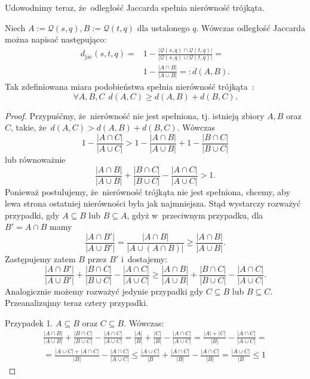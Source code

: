 \documentclass{praca1}
\begin{document}
Udowodnimy teraz, że~odległość Jaccarda spełnia nierówność trójkąta.

\begin{lemma}
Niech $A := \mathcal{Q}(s,q), B:= \mathcal{Q}(t,q)$ dla ustalonego $q$. Wówczas odległość Jaccarda można napisać następująco:
\begin{align*}
d_{\mathrm{jac}}(s,t,q) = & 1 - \frac{|\mathcal{Q}(s,q) \cap \mathcal{Q}(t,q)|}{|\mathcal{Q}(s,q) \cup \mathcal{Q}(t,q)|} = \\ & 1 - \frac{|A\cap B|}{|A\cup B|}= :d(A, B).
\end{align*}
Tak zdefiniowana miara podobieństwa spełnia nierówność trójkąta~\cite{Wilbik2012:distance}:
$$
\forall A, B, C\ \ d(A, C) \geq d(A,B) + d(B, C).
$$
\end{lemma}

\begin{proof}
Przypuśćmy, że~nierówność nie jest spełniona, tj. istnieją zbiory $A, B$ oraz $C$, takie, że~$ d(A, C) > d(A,B) + d(B, C)$. Wówczas
$$
1 - \frac{|A\cap C|}{|A\cup C|} > 1 - \frac{|A\cap B|}{|A\cup B|} + 1 - \frac{|B\cap C|}{|B\cup C|}
$$
lub równoważnie
\begin{equation}
\label{eq:015}
\frac{|A\cap B|}{|A\cup B|} + \frac{|B\cap C|}{|B\cup C|} - \frac{|A\cap C|}{|A\cup C|} > 1.
\end{equation}
Ponieważ postulujemy, że~nierówność trójkąta nie jest spełniona, chcemy, aby lewa strona ostatniej nierówności była jak najmniejsza. Stąd wystarczy rozważyć przypadki, gdy $A \subseteq B$ lub $B \subseteq A$, gdyż w~przeciwnym przypadku, dla $B' = A\cap B$ mamy
$$
\frac{|A\cap B'|}{|A\cup B'|} = \frac{|A\cap B|}{|A\cup (A \cap B)|} \geq \frac{|A\cap B|}{|A\cup B|}.
$$
Zastępujemy zatem $B$ przez $B'$ i~dostajemy:
$$
\frac{|A\cap B'|}{|A\cup B'|} + \frac{|B\cap C|}{|B\cup C|} - \frac{|A\cap C|}{|A\cup C|} \geq \frac{|A\cap B|}{|A\cup B|} + \frac{|B\cap C|}{|B\cup C|} - \frac{|A\cap C|}{|A\cup C|}.
$$
Analogicznie możemy rozważyć jedynie przypadki gdy $C \subseteq B$ lub $B \subseteq C$. Przeanalizujmy teraz cztery przypadki.

Przypadek 1. $A\subseteq B$ oraz $C \subseteq B$. Wówczas:
\begin{multline*}
\frac{|A\cap B|}{|A\cup B|} + \frac{|B\cap C|}{|B\cup C|} - \frac{|A\cap C|}{|A\cup C|} = 
\frac{|A|}{|B|} + \frac{|C|}{|B|} - \frac{|A\cap C|}{|A\cup C|} =
\frac{|A| + |C|}{|B|} - \frac{|A\cap C|}{|A\cup C|} =\\
= \frac{|A\cup C| + |A\cap C|}{|B|} - \frac{|A\cap C|}{|A\cup C|} \leq 
\frac{|A\cup C|}{|B} + \frac{|A\cap C|}{|B|} - \frac{|A\cap C|}{|B|} = 
\frac{|A\cup C|}{|B}  \leq 1
\end{multline*}


\end{proof}
\end{document}
